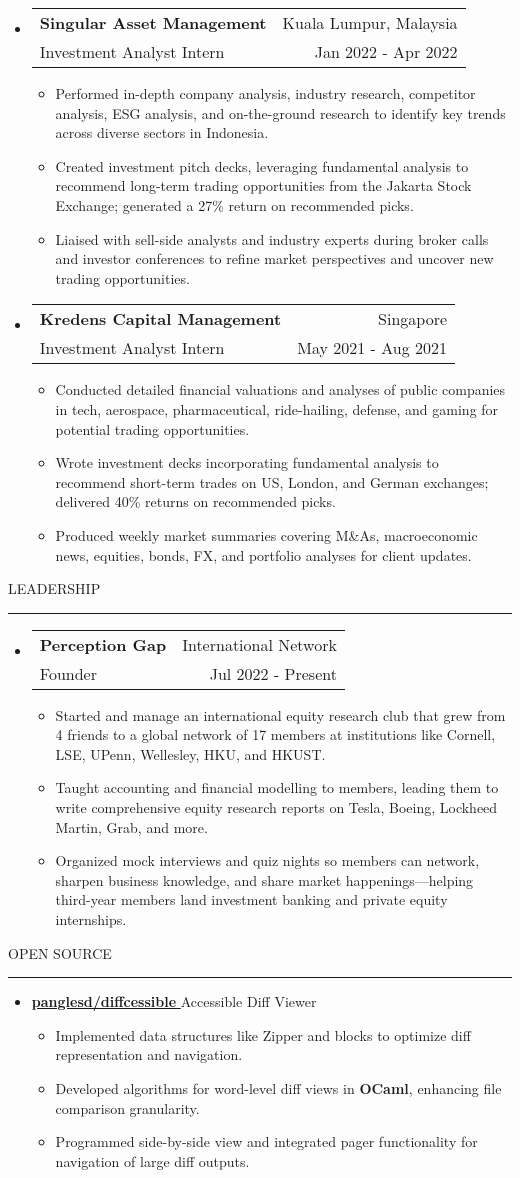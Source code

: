 \documentclass[letterpaper, 11pt]{article}
\makeatletter
\def\sectionlineskip{\medskip}
\def\sectionskip{\medskip}
\newcommand{\SectionHeading}[1]{
  \sectionskip
  \raggedright\raggedbottom\MakeUppercase{\large{#1}}
  \sectionlineskip
  \hrule
  \color{black}
}
\newcommand{\ResumeEntryTSDL}[4]{
  \vspace{1pt}\item
    \begin{tabular*}{\textwidth}[t]{l@{\extracolsep{\fill}}r} 
      \textbf{#1} & #2 \\
      #3 & #4 \\
    \end{tabular*}\vspace{-2.835pt} %
}
\newcommand{\ResumeItemDefault}[1]{
  \item{
    #1 \vspace{-2.835pt}
  }
}
\newcommand{\ResumeEntryStart}{\begin{itemize}[leftmargin=0mm, label={}]}
\newcommand{\ResumeEntryEnd}{\end{itemize}\vspace{-2.835pt}} %
\newcommand{\ResumeItemListStart}{\begin{itemize}[leftmargin=5mm, label=$\bullet$, itemsep=1mm, parsep=1mm]} %
\newcommand{\ResumeItemListEnd}{\end{itemize}}
\newcommand{\OpenSourceProjectItem}[3]{
  \item{
    \href{#1}{\textbf{#2} }\hfill{#3}\vspace{-2.835pt}
  }
}
\makeatother
\begin{document}
  \ResumeEntryStart
    \ResumeEntryTSDL{Singular Asset Management}{Kuala Lumpur, Malaysia}{Investment Analyst Intern}{Jan 2022 - Apr 2022}
    \ResumeItemListStart
      \ResumeItemDefault{Performed in-depth company analysis, industry research, competitor analysis, ESG analysis, and on-the-ground research to identify key trends across diverse sectors in Indonesia.}
      \ResumeItemDefault{Created investment pitch decks, leveraging fundamental analysis to recommend long-term trading opportunities from the Jakarta Stock Exchange; generated a 27\% return on recommended picks.}
      \ResumeItemDefault{Liaised with sell-side analysts and industry experts during broker calls and investor conferences to refine market perspectives and uncover new trading opportunities.}
    \ResumeItemListEnd
  \ResumeEntryEnd

  \ResumeEntryStart
    \ResumeEntryTSDL{Kredens Capital Management}{Singapore}{Investment Analyst Intern}{May 2021 - Aug 2021}
    \ResumeItemListStart
      \ResumeItemDefault{Conducted detailed financial valuations and analyses of public companies in tech, aerospace, pharmaceutical, ride-hailing, defense, and gaming for potential trading opportunities.}
      \ResumeItemDefault{Wrote investment decks incorporating fundamental analysis to recommend short-term trades on US, London, and German exchanges; delivered 40\% returns on recommended picks.}
      \ResumeItemDefault{Produced weekly market summaries covering M\&As, macroeconomic news, equities, bonds, FX, and portfolio analyses for client updates.}
    \ResumeItemListEnd
  \ResumeEntryEnd

  \SectionHeading{Leadership}
  \ResumeEntryStart
    \ResumeEntryTSDL{Perception Gap}{International Network}{Founder}{Jul 2022 - Present}
    \ResumeItemListStart
      \ResumeItemDefault{Started and manage an international equity research club that grew from 4 friends to a global network of 17 members at institutions like Cornell, LSE, UPenn, Wellesley, HKU, and HKUST.}
      \ResumeItemDefault{Taught accounting and financial modelling to members, leading them to write comprehensive equity research reports on Tesla, Boeing, Lockheed Martin, Grab, and more.}
      \ResumeItemDefault{Organized mock interviews and quiz nights so members can network, sharpen business knowledge, and share market happenings—helping third-year members land investment banking and private equity internships.}
    \ResumeItemListEnd
  \ResumeEntryEnd

  \SectionHeading{Open Source}
  \ResumeEntryStart
  \OpenSourceProjectItem{https://github.com/panglesd/diffcessible}{panglesd/diffcessible}{Accessible Diff Viewer}
  \ResumeItemListStart
  \ResumeItemDefault{Implemented data structures like Zipper and blocks to optimize diff representation and navigation.}
  \ResumeItemDefault{Developed algorithms for word-level diff views in \textbf{OCaml}, enhancing file comparison granularity.}
  \ResumeItemDefault{Programmed side-by-side view and integrated pager functionality for navigation of large diff outputs.}
  \ResumeItemListEnd
  \ResumeEntryEnd
\end{document}
